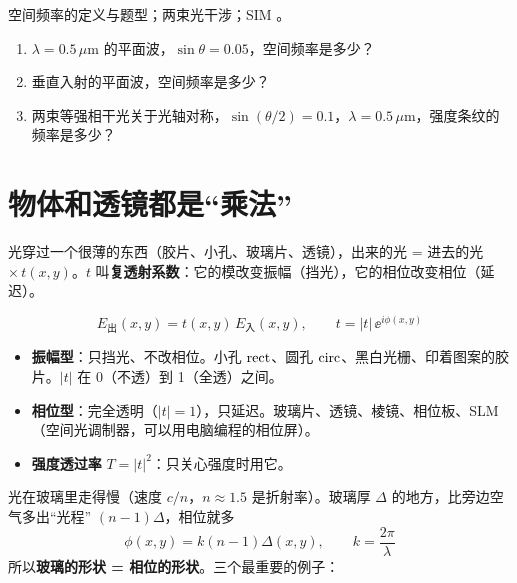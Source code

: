 \psee 空间频率的定义与题型\pageref{sec:spfreq}；两束光干涉\pageref{sec:twobeam}；SIM \pageref{sec:sim}。

\begin{enumerate}[label=\arabic*.]
\item $\lambda=0.5\,\mu$m 的平面波，$\sin\theta=0.05$，空间频率是多少？
\item 垂直入射的平面波，空间频率是多少？
\item 两束等强相干光关于光轴对称，$\sin(\theta/2)=0.1$，$\lambda=0.5\,\mu$m，强度条纹的频率是多少？
\end{enumerate}

\section{物体和透镜都是“乘法”}\label{sec:p-screen}

\begin{idea}[一句话]
光穿过一个很薄的东西（胶片、小孔、玻璃片、透镜），出来的光 = 进去的光 $\times\,t(x,y)$。$t$ 叫\textbf{复透射系数}：它的模改变振幅（挡光），它的相位改变相位（延迟）。
\end{idea}

\[
E_{\text{出}}(x,y)=t(x,y)\,E_{\text{入}}(x,y),\qquad t=|t|\,\ee^{i\phi(x,y)}
\]
\begin{itemize}
\item \textbf{振幅型}：只挡光、不改相位。小孔 $\operatorname{rect}$、圆孔 $\operatorname{circ}$、黑白光栅、印着图案的胶片。$|t|$ 在 0（不透）到 1（全透）之间。
\item \textbf{相位型}：完全透明（$|t|=1$），只延迟。玻璃片、透镜、棱镜、相位板、SLM（空间光调制器，可以用电脑编程的相位屏）。
\item \textbf{强度透过率} $T=|t|^2$：只关心强度时用它。
\end{itemize}

光在玻璃里走得慢（速度 $c/n$，$n\approx1.5$ 是折射率）。玻璃厚 $\Delta$ 的地方，比旁边空气多出“光程” $(n-1)\Delta$，相位就多
\[
\phi(x,y)=k(n-1)\Delta(x,y),\qquad k=\frac{2\pi}\lambda
\]
所以\textbf{玻璃的形状 = 相位的形状}。三个最重要的例子：


